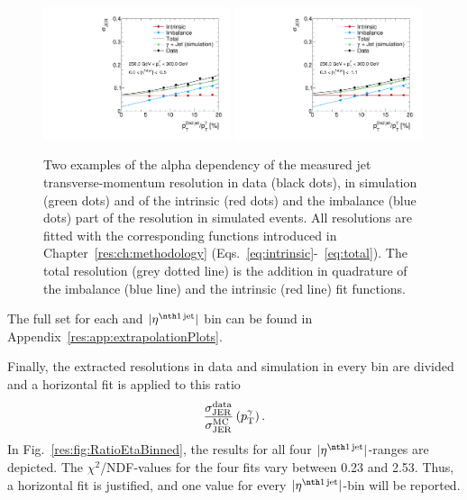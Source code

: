 \begin{figure}[b]
 \centering
    \includegraphics[width=0.49\textwidth]{figures/resolution/results/JER_for_1_eta_bin_10_pTGamma_bin_all_contributions_PFCHS_RMS99_mc.pdf}
    \includegraphics[width=0.49\textwidth]{figures/resolution/results/JER_for_2_eta_bin_10_pTGamma_bin_all_contributions_PFCHS_RMS99_mc.pdf}
  \caption{Two examples of the alpha dependency of the measured jet transverse-momentum resolution in data (black dots), in simulation (green dots) and  of the intrinsic (red dots) and the imbalance (blue dots) part 
           of the resolution in simulated events. All resolutions are fitted with the corresponding functions introduced in Chapter~\ref{res:ch:methodology} (Eqs.~\eqref{eq:intrinsic}-~\eqref{eq:total}).
           The total resolution (grey dotted line) is the addition in quadrature of the imbalance (blue line) and the intrinsic (red line) fit functions. }
  \label{res:fig:ExtrapolationsWithData}
\end{figure}

The full set for each \ptgamma and $|\etafirstjet|$ bin can be found in Appendix~\ref{res:app:extrapolationPlots}.

Finally, the extracted resolutions in data and simulation in every \ptgamma bin are divided and a horizontal fit is applied to this ratio
\begin{equation*}
\frac{\sigma_\mathrm{JER}^{\text{data}}}{\sigma_\mathrm{JER}^{\text{MC}}} \left( p_{\text{T}}^{\gamma} \right).
\end{equation*}
In Fig.~\ref{res:fig:RatioEtaBinned}, the results for all four $|\etafirstjet|$-ranges are depicted. 
The $\chi^2$/NDF-values for the four fits vary between 0.23 and 2.53. 
Thus, a horizontal fit is justified, and one value for every $|\etafirstjet|$-bin will be reported.

